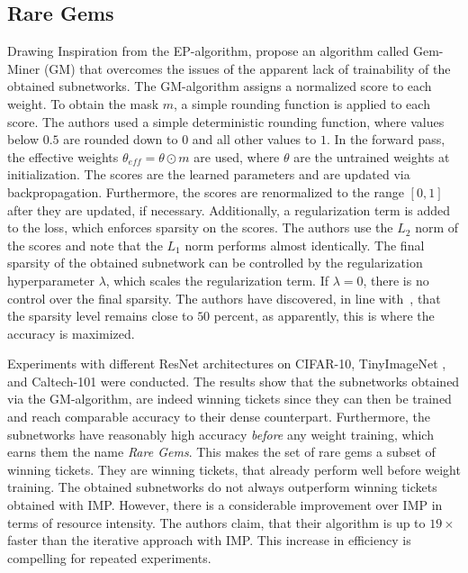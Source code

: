 \subsection{Rare Gems}
Drawing Inspiration from the EP-algorithm, \textcite{RareGems} propose an algorithm called Gem-Miner (GM) that overcomes the issues of the apparent lack of trainability of the obtained subnetworks.
The {GM}-algorithm assigns a normalized score to each weight. 
To obtain the mask $m$, a simple rounding function is applied to each score. The authors used a simple deterministic rounding function, where values below $0.5$ are rounded down to $0$ and all other values to $1$.
In the forward pass, the effective weights $\theta_{eff} = \theta \odot m$ are used, where $\theta$ are the untrained weights at initialization. 
The scores are the learned parameters and are updated via backpropagation.
Furthermore, the scores are renormalized to the range $[0,1]$ after they are updated, if necessary.
Additionally, a regularization term is added to the loss, which enforces sparsity on the scores. 
The authors use the $L_2$ norm of the scores and note that the $L_1$ norm performs almost identically.
The final sparsity of the obtained subnetwork can be controlled by the regularization hyperparameter $\lambda$, which scales the regularization term.
If $\lambda = 0$, there is no control over the final sparsity. 
The authors have discovered, in line with~\cite{EdgePopup}, that the sparsity level remains close to $50$ percent, as apparently, this is where the accuracy is maximized.

Experiments with different ResNet architectures on CIFAR-10, TinyImageNet \autocite{Tinyimagenet}, and Caltech-101 \autocite{Caltech101} were conducted. 
The results show that the subnetworks obtained via the {GM}-algorithm, are indeed winning tickets since they can then be trained and reach comparable accuracy to their dense counterpart.
Furthermore, the subnetworks have reasonably high accuracy \textit{before} any weight training, which earns them the name \textit{Rare Gems}. 
This makes the set of rare gems a subset of winning tickets. 
They are winning tickets, that already perform well before weight training.
The obtained subnetworks do not always outperform winning tickets obtained with {IMP}. 
However, there is a considerable improvement over {IMP} in terms of resource intensity.
The authors claim, that their algorithm is up to $19\times$ faster than the iterative approach with {IMP}. 
This increase in efficiency is compelling for repeated experiments.

